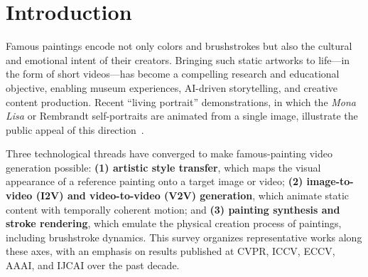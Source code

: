 \section{Introduction}
\label{sec:intro}

Famous paintings encode not only colors and brushstrokes but also the cultural and
emotional intent of their creators. Bringing such static artworks to life---in the form
of short videos---has become a compelling research and educational objective, enabling
museum experiences, AI-driven storytelling, and creative content production. Recent
``living portrait'' demonstrations, in which the \textit{Mona Lisa} or Rembrandt
self-portraits are animated from a single image, illustrate the public appeal of this
direction~\cite{zakharov2019fewshot,guo2024liveportrait}.

Three technological threads have converged to make famous-painting video generation
possible: \textbf{(1) artistic style transfer}, which maps the visual appearance of a
reference painting onto a target image or video; \textbf{(2) image-to-video (I2V) and
video-to-video (V2V) generation}, which animate static content with temporally coherent
motion; and \textbf{(3) painting synthesis and stroke rendering}, which emulate the
physical creation process of paintings, including brushstroke dynamics. This survey
organizes representative works along these axes, with an emphasis on results published at
CVPR, ICCV, ECCV, AAAI, and IJCAI over the past decade.
